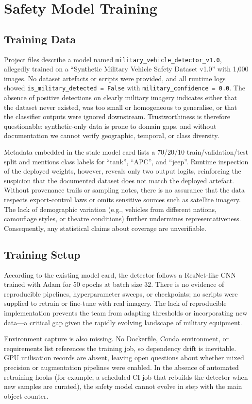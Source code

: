 \documentclass[conference]{IEEEtran}
\begin{document}
\section{Safety Model Training}
\subsection{Training Data}
Project files describe a model named \texttt{military\_vehicle\_detector\_v1.0}, allegedly trained on a ``Synthetic Military Vehicle Safety Dataset v1.0'' with 1{,}000 images. No dataset artefacts or scripts were provided, and all runtime logs showed \texttt{is\_military\_detected = False} with \texttt{military\_confidence = 0.0}. The absence of positive detections on clearly military imagery indicates either that the dataset never existed, was too small or homogeneous to generalise, or that the classifier outputs were ignored downstream. Trustworthiness is therefore questionable: synthetic-only data is prone to domain gaps, and without documentation we cannot verify geographic, temporal, or class diversity.

Metadata embedded in the stale model card lists a 70/20/10 train/validation/test split and mentions class labels for ``tank'', ``APC'', and ``jeep''. Runtime inspection of the deployed weights, however, reveals only two output logits, reinforcing the suspicion that the documented dataset does not match the deployed artefact. Without provenance trails or sampling notes, there is no assurance that the data respects export-control laws or omits sensitive sources such as satellite imagery. The lack of demographic variation (e.g., vehicles from different nations, camouflage styles, or theatre conditions) further undermines representativeness. Consequently, any statistical claims about coverage are unverifiable.

\subsection{Training Setup}
According to the existing model card, the detector follows a ResNet-like CNN trained with Adam for 50 epochs at batch size 32. There is no evidence of reproducible pipelines, hyperparameter sweeps, or checkpoints; no scripts were supplied to retrain or fine-tune with real imagery. The lack of reproducible implementation prevents the team from adapting thresholds or incorporating new data---a critical gap given the rapidly evolving landscape of military equipment.

Environment capture is also missing. No Dockerfile, Conda environment, or requirements list references the training job, so dependency drift is inevitable. GPU utilisation records are absent, leaving open questions about whether mixed precision or augmentation pipelines were enabled. In the absence of automated retraining hooks (for example, a scheduled CI job that rebuilds the detector when new samples are curated), the safety model cannot evolve in step with the main object counter.
\end{document}
